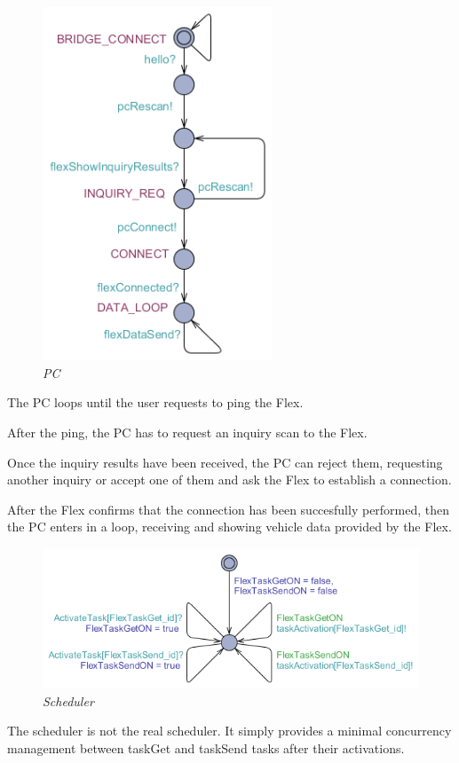 \documentclass[paper=a4, fontsize=11pt]{scrartcl} %
\numberwithin{equation}{section} %
\numberwithin{figure}{section} %
\numberwithin{table}{section} %
\begin{document}
\begin{figure}[H]
  \centering
  \includegraphics[width=2.7in]{img/FLEX-PC_PC}
  \caption{\textit{PC}}
\end{figure}

The PC loops until the user requests to ping the Flex.

After the ping, the PC has to request an inquiry scan to the Flex.

Once the inquiry results have been received, the PC can reject them, requesting another inquiry or accept one of them and ask the Flex to establish a connection.

After the Flex confirms that the connection has been succesfully performed, then the PC enters in a loop, receiving and showing vehicle data provided by the Flex.

\begin{figure}[H]
  \centering
  \includegraphics[width=6in]{img/FLEX-PC_scheduler}
  \caption{\textit{Scheduler}}
\end{figure}

The scheduler is not the real scheduler. It simply provides a minimal concurrency management between taskGet and taskSend tasks after their activations.
\end{document}
